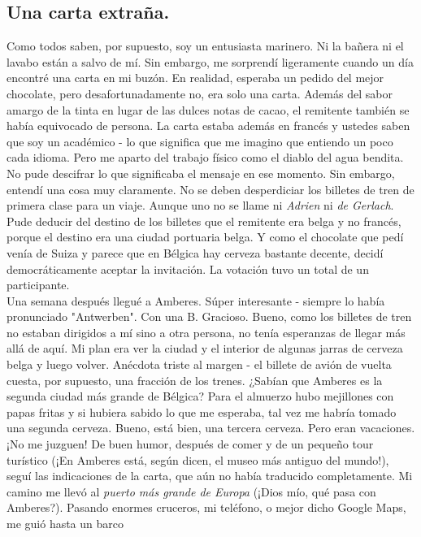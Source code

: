 \documentclass{article}
\begin{document}
    \subsection{Una carta extraña.}
    \noindent 
    Como todos saben, por supuesto, soy un entusiasta marinero. Ni la bañera ni %
    el
    lavabo están a salvo de mí. Sin embargo, me sorprendí ligeramente cuando un día encontré una carta en mi buzón.
    En
    realidad, esperaba un pedido del mejor chocolate, pero desafortunadamente no, era solo una carta. Además del
    sabor
    amargo de la tinta en lugar de las dulces notas de cacao, el remitente también se había equivocado de persona.
    La
    carta estaba además en francés y ustedes saben que soy un académico - lo que significa que me imagino que
    entiendo
    un poco cada idioma. Pero me aparto del trabajo físico como el diablo del agua bendita. No pude descifrar lo que
    significaba el mensaje en ese momento. Sin embargo, entendí una cosa muy claramente. No se deben desperdiciar
    los
    billetes de tren de primera clase para un viaje. Aunque uno no se llame ni \textit{Adrien} ni \textit{de Gerlach}.
    Pude deducir del destino de los billetes que el remitente era belga y no francés, porque el destino era una
    ciudad
    portuaria belga. Y como el chocolate que pedí venía de Suiza y parece que en Bélgica hay cerveza bastante
    decente,
    decidí democráticamente aceptar la invitación. La votación tuvo un total de un participante.\\
    \noindent Una semana después llegué a Amberes. Súper interesante - siempre lo había pronunciado "Antwerben". Con una B.
    Gracioso. Bueno, como los billetes de tren no estaban dirigidos a mí sino a otra persona, no tenía esperanzas de
    llegar más allá de aquí. Mi plan era ver la ciudad y el interior de algunas jarras de cerveza belga y luego
    volver. Anécdota triste al margen - el billete de avión de vuelta cuesta, por supuesto, una fracción de los
    trenes. ¿Sabían que Amberes es la segunda ciudad más grande de Bélgica? Para el almuerzo hubo mejillones con
    papas
    fritas y si hubiera sabido lo que me esperaba, tal vez me habría tomado una segunda cerveza. Bueno, está bien,
    una
    tercera cerveza. Pero eran vacaciones. ¡No me juzguen! De buen humor, después de comer y de un pequeño tour
    turístico (¡En Amberes está, según dicen, el museo más antiguo del mundo!), seguí las indicaciones de la carta,
    que aún no había traducido completamente. Mi camino me llevó al \textit{puerto más grande de Europa} (¡Dios mío,
    qué
    pasa con Amberes?). Pasando enormes cruceros, mi teléfono, o mejor dicho Google Maps, me guió hasta un barco
\end{document}
